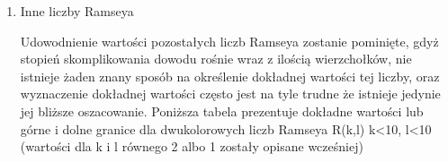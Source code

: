 \documentclass[11pt]{article}
\begin{document}
\begin{enumerate}
\item Inne liczby Ramseya \hfill \par

 Udowodnienie wartości pozostałych liczb Ramseya zostanie pominięte, gdyż stopień skomplikowania dowodu rośnie wraz z ilością wierzchołków, nie istnieje żaden znany sposób na określenie dokładnej wartości tej liczby, oraz wyznaczenie dokładnej wartości często jest na tyle trudne że istnieje jedynie jej bliższe oszacowanie. Poniższa tabela prezentuje dokładne wartości lub górne i dolne granice dla dwukolorowych liczb Ramseya R(k,l) k<10, l<10 (wartości dla k i l równego 2 albo 1 zostały opisane wcześniej)
 
\hfill 

\end{enumerate}
\end{document}
